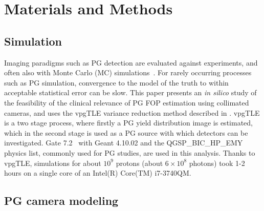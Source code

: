 \documentclass[a4paper,english]{article}
\begin{document}
\section{Materials and Methods}

\subsection{Simulation}

Imaging paradigms such as PG detection are evaluated against experiments, and often also with Monte Carlo (MC) simulations~\citep{Moteabbed2011,Gueth2013,Robert2013,Golnik2014a,Janssen2014}. For rarely occurring processes such as PG simulation, convergence to the model of the truth to within acceptable statistical error can be slow. This paper presents an \emph{in silico} study of the feasibility of the clinical relevance of PG FOP estimation using collimated cameras, and uses the vpgTLE variance reduction method described in \cite{Huisman2016}. vpgTLE is a two stage process, where firstly a PG yield distribution image is estimated, which in the second stage is used as a PG source with which detectors can be investigated. Gate 7.2~\citep{Sarrut2014} with Geant 4.10.02 and the QGSP\_BIC\_HP\_EMY physics list, commonly used for PG studies, are used in this analysis. Thanks to vpgTLE, simulations for about $10^9$ protons (about $6\times10^8$ photons) took 1-2 hours on a single core of an Intel(R) Core(TM) i7-3740QM.

\subsection{PG camera modeling}\label{sec:camera}
\end{document}
